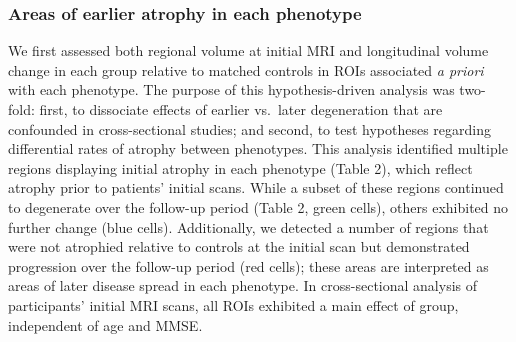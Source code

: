 \documentclass[]{article}
\begin{document}
\subsubsection*{Areas of earlier atrophy in each
phenotype}\label{areas-of-earlier-atrophy-in-each-phenotype}

We first assessed both regional volume at initial MRI and longitudinal
volume change in each group relative to matched controls in ROIs
associated \emph{a priori} with each phenotype. The purpose of this
hypothesis-driven analysis was two-fold: first, to dissociate effects of
earlier vs.~later degeneration that are confounded in cross-sectional
studies; and second, to test hypotheses regarding differential rates of
atrophy between phenotypes. This analysis identified multiple regions
displaying initial atrophy in each phenotype (Table 2), which reflect
atrophy prior to patients' initial scans. While a subset of these
regions continued to degenerate over the follow-up period (Table 2,
green cells), others exhibited no further change (blue cells).
Additionally, we detected a number of regions that were not atrophied
relative to controls at the initial scan but demonstrated progression
over the follow-up period (red cells); these areas are interpreted as
areas of later disease spread in each phenotype. In cross-sectional
analysis of participants' initial MRI scans, all ROIs exhibited a main
effect of group, independent of age and MMSE.
\end{document}
